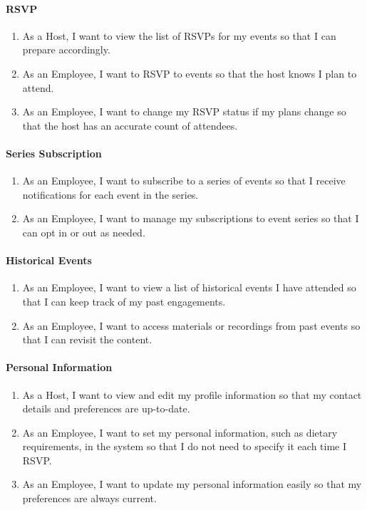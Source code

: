 \documentclass[a4paper,12pt]{article}
\begin{document}
\paragraph{RSVP}

\begin{enumerate}
    \item As a Host, I want to view the list of RSVPs for my events so that I can prepare accordingly.
    \item As an Employee, I want to RSVP to events so that the host knows I plan to attend.
    \item As an Employee, I want to change my RSVP status if my plans change so that the host has an accurate count of attendees.
\end{enumerate}

\paragraph{Series Subscription}

\begin{enumerate}
    \item As an Employee, I want to subscribe to a series of events so that I receive notifications for each event in the series.
    \item As an Employee, I want to manage my subscriptions to event series so that I can opt in or out as needed.
\end{enumerate}

\paragraph{Historical Events}

\begin{enumerate}
    \item As an Employee, I want to view a list of historical events I have attended so that I can keep track of my past engagements.
    \item As an Employee, I want to access materials or recordings from past events so that I can revisit the content.
\end{enumerate}

\paragraph{Personal Information}

\begin{enumerate}
    \item As a Host, I want to view and edit my profile information so that my contact details and preferences are up-to-date.
    \item As an Employee, I want to set my personal information, such as dietary requirements, in the system so that 
    I do not need to specify it each time I RSVP.
    \item As an Employee, I want to update my personal information easily so that my preferences are always current.
\end{enumerate}
\end{document}

